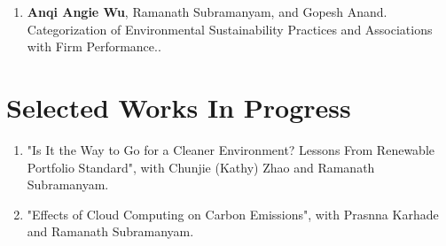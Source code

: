 \documentclass[margin,line]{resume}
\begin{document}
\begin{resume}
\begin{enumerate}[topsep=0pt, leftmargin=*]
 \item \textbf{Anqi Angie Wu}, Ramanath Subramanyam, and Gopesh Anand. 
       Categorization of Environmental Sustainability Practices and Associations with Firm Performance.. 
        
       
\end{enumerate}   
  
 	  \section{\mysidestyle Selected Works In Progress} 
 	  \begin{enumerate}[topsep=0pt, leftmargin=*]
         

         \item "Is It the Way to Go for a Cleaner Environment? Lessons From Renewable Portfolio Standard", with Chunjie (Kathy) Zhao and Ramanath Subramanyam.  



       \item "Effects of Cloud Computing on Carbon Emissions", with Prasnna Karhade and Ramanath Subramanyam. 


	  \end{enumerate}
	  


\end{resume}
\end{document}
